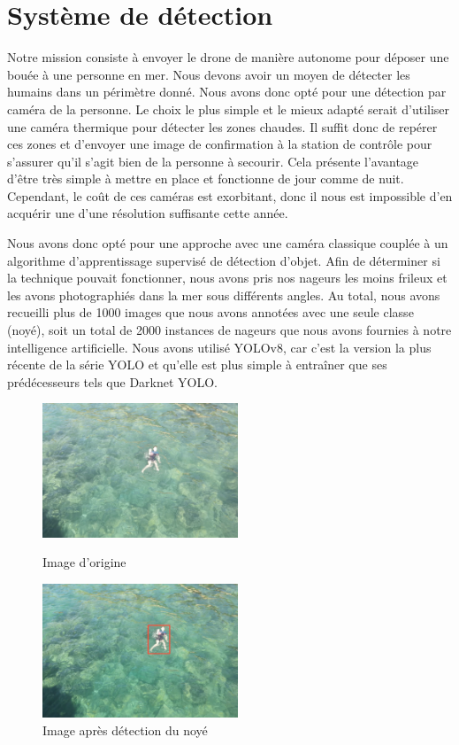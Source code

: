 \documentclass[a4paper,12pt,french]{report}
\begin{document}
\section{Système de détection}

Notre mission consiste à envoyer le drone de manière autonome pour déposer une bouée à une personne en mer. Nous devons avoir un moyen de détecter les humains dans un périmètre donné. Nous avons donc opté pour une détection par caméra de la personne. Le choix le plus simple et le mieux adapté serait d'utiliser une caméra thermique pour détecter les zones chaudes. Il suffit donc de repérer ces zones et d'envoyer une image de confirmation à la station de contrôle pour s'assurer qu'il s'agit bien de la personne à secourir. Cela présente l'avantage d'être très simple à mettre en place et fonctionne de jour comme de nuit. Cependant, le coût de ces caméras est exorbitant, donc il nous est impossible d'en acquérir une d'une résolution suffisante cette année.\newline

Nous avons donc opté pour une approche avec une caméra classique couplée à un algorithme d'apprentissage supervisé de détection d'objet. Afin de déterminer si la technique pouvait fonctionner, nous avons pris nos nageurs les moins frileux et les avons photographiés dans la mer sous différents angles. Au total, nous avons recueilli plus de 1000 images que nous avons annotées avec une seule classe (noyé), soit un total de 2000 instances de nageurs que nous avons fournies à notre intelligence artificielle. Nous avons utilisé YOLOv8, car c'est la version la plus récente de la série YOLO et qu'elle est plus simple à entraîner que ses prédécesseurs tels que Darknet YOLO.
\bigskip
\begin{figure}[h]
    \begin{minipage}{0.5\textwidth}
        \centering
        \includegraphics[height=4cm]{figures/vid.png}
        \caption{Image d'origine}
        \label{image}
    \end{minipage}%
    \begin{minipage}{0.5\textwidth}
        \centering
        \includegraphics[height=4cm]{figures/det.png}
        \caption{Image après détection du noyé}
        \label{detect}
    \end{minipage}
\end{figure}
\end{document}
